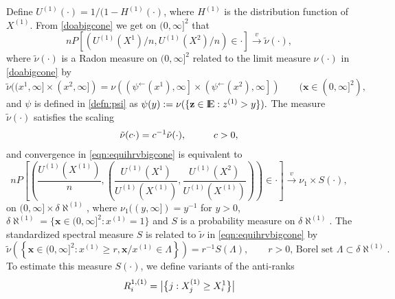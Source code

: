 \documentclass[11 pt]{amsart}
\numberwithin{equation}{section}
\begin{document}
{{Define $U^{(1)}(\cdot) = 1/(1 - H^{(1)}(\cdot)$, where $H^{(1)}$ is
the distribution function of $X^{(1)}$. From \eqref{doabigcone} {we get
on $(0, \infty]^2$ that}
\begin{equation}\label{eqn:equihrvbigcone}
nP\left[ \left( {U^{(1)}(X^1)}/{n}, {U^{(1)}(X^2)}/{n} \right) \in \cdot \right] \stackrel{v}{\rightarrow} \tilde \nu(\cdot),
\end{equation}
{where $\tilde \nu(\cdot)$ is a Radon measure on $(0, \infty]^2$
 related to the limit measure  $\nu(\cdot)$ in \eqref{doabigcone} by }
\begin{equation}\label{nuandtildenu}
\tilde \nu((x^1, \infty] \times (x^2, \infty] ) = \nu \left(
  \left(\psi^{\leftarrow}(x^1), \infty \right] \times
  \left(\psi^{\leftarrow}(x^2), \infty \right] \right)\qquad ({\boldsymbol x}  \in (0, \infty]^2),
\end{equation}
{and} $\psi$ is defined in \eqref{defn:psi} as $\psi(y) := \nu(
\{{\bf{z}} \in {\mathop{\rm I\kern -0.20em E}\nolimits}: z^{(1)} > y \}).$
 The measure $\tilde \nu(\cdot)$ satisfies the scaling
\begin{align}\label{scaling_nutilde}
\tilde \nu( c \cdot) = c^{-1} \tilde \nu( \cdot), \hskip 1 cm c > 0,
\end{align}
and convergence in \eqref{eqn:equihrvbigcone} is equivalent to 
\begin{equation}\label{eqn:decompbigcone}
nP\left[ \left( \frac{U^{(1)}\left(X^{(1)}\right)}{n} , \left( \frac{U^{(1)}(X^1)}{U^{(1)}(X^{(1)})},  \frac{U^{(1)}(X^2)}{U^{(1)}(X^{(1)})} \right) \right) \in \cdot \right] \stackrel{v}{\rightarrow} \nu_1 \times  S(\cdot),
\end{equation}
on $(0, \infty] \times \delta \aleph^{(1)}$, where $\nu_1((y, \infty]) = y^{-1}$ for
$y > 0$, $\delta \aleph^{(1)} =  \{ {\boldsymbol x}  \in (0, \infty]^2 :
x^{(1)} = 1\}$ and $S$ is a probability measure on $\delta
\aleph^{(1)}$. {The} standardized spectral measure $S$
{is related to}  $\tilde \nu$ in \eqref{eqn:equihrvbigcone}
by
 \begin{equation}\label{tildenuands}
 \tilde \nu \left( \left \{ {\boldsymbol x} \in (0, \infty]^2 : x^{(1)} \ge r,
     {\boldsymbol x}/x^{(1)} \in \Lambda \right \} \right) = r^{-1} S(\Lambda),
 \qquad r>0,\, \text{Borel set }\Lambda \subset \delta \aleph^{(1)}.
 \end{equation}
{To
estimate this} measure $S(\cdot)$, we define variants of the anti-ranks
\begin{align}\label{defn:nonstanbig_antiranks}
R^{1, (1)}_i = \bigl{|} \bigl\{ j: X^{(1)}_j \ge X^1_i \bigr\} \bigr{|}

\end{align}}}
\end{document}
